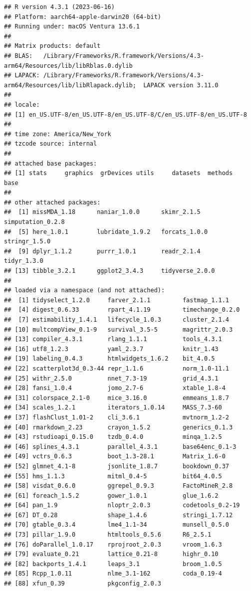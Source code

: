 \documentclass[
]{book}
\begin{document}
\begin{verbatim}
## R version 4.3.1 (2023-06-16)
## Platform: aarch64-apple-darwin20 (64-bit)
## Running under: macOS Ventura 13.6.1
## 
## Matrix products: default
## BLAS:   /Library/Frameworks/R.framework/Versions/4.3-arm64/Resources/lib/libRblas.0.dylib 
## LAPACK: /Library/Frameworks/R.framework/Versions/4.3-arm64/Resources/lib/libRlapack.dylib;  LAPACK version 3.11.0
## 
## locale:
## [1] en_US.UTF-8/en_US.UTF-8/en_US.UTF-8/C/en_US.UTF-8/en_US.UTF-8
## 
## time zone: America/New_York
## tzcode source: internal
## 
## attached base packages:
## [1] stats     graphics  grDevices utils     datasets  methods   base     
## 
## other attached packages:
##  [1] missMDA_1.18      naniar_1.0.0      skimr_2.1.5       simputation_0.2.8
##  [5] here_1.0.1        lubridate_1.9.2   forcats_1.0.0     stringr_1.5.0    
##  [9] dplyr_1.1.2       purrr_1.0.1       readr_2.1.4       tidyr_1.3.0      
## [13] tibble_3.2.1      ggplot2_3.4.3     tidyverse_2.0.0  
## 
## loaded via a namespace (and not attached):
##  [1] tidyselect_1.2.0     farver_2.1.1         fastmap_1.1.1       
##  [4] digest_0.6.33        rpart_4.1.19         timechange_0.2.0    
##  [7] estimability_1.4.1   lifecycle_1.0.3      cluster_2.1.4       
## [10] multcompView_0.1-9   survival_3.5-5       magrittr_2.0.3      
## [13] compiler_4.3.1       rlang_1.1.1          tools_4.3.1         
## [16] utf8_1.2.3           yaml_2.3.7           knitr_1.43          
## [19] labeling_0.4.3       htmlwidgets_1.6.2    bit_4.0.5           
## [22] scatterplot3d_0.3-44 repr_1.1.6           norm_1.0-11.1       
## [25] withr_2.5.0          nnet_7.3-19          grid_4.3.1          
## [28] fansi_1.0.4          jomo_2.7-6           xtable_1.8-4        
## [31] colorspace_2.1-0     mice_3.16.0          emmeans_1.8.7       
## [34] scales_1.2.1         iterators_1.0.14     MASS_7.3-60         
## [37] flashClust_1.01-2    cli_3.6.1            mvtnorm_1.2-2       
## [40] rmarkdown_2.23       crayon_1.5.2         generics_0.1.3      
## [43] rstudioapi_0.15.0    tzdb_0.4.0           minqa_1.2.5         
## [46] splines_4.3.1        parallel_4.3.1       base64enc_0.1-3     
## [49] vctrs_0.6.3          boot_1.3-28.1        Matrix_1.6-0        
## [52] glmnet_4.1-8         jsonlite_1.8.7       bookdown_0.37       
## [55] hms_1.1.3            mitml_0.4-5          bit64_4.0.5         
## [58] visdat_0.6.0         ggrepel_0.9.3        FactoMineR_2.8      
## [61] foreach_1.5.2        gower_1.0.1          glue_1.6.2          
## [64] pan_1.9              nloptr_2.0.3         codetools_0.2-19    
## [67] DT_0.28              shape_1.4.6          stringi_1.7.12      
## [70] gtable_0.3.4         lme4_1.1-34          munsell_0.5.0       
## [73] pillar_1.9.0         htmltools_0.5.6      R6_2.5.1            
## [76] doParallel_1.0.17    rprojroot_2.0.3      vroom_1.6.3         
## [79] evaluate_0.21        lattice_0.21-8       highr_0.10          
## [82] backports_1.4.1      leaps_3.1            broom_1.0.5         
## [85] Rcpp_1.0.11          nlme_3.1-162         coda_0.19-4         
## [88] xfun_0.39            pkgconfig_2.0.3
\end{verbatim}
\end{document}
